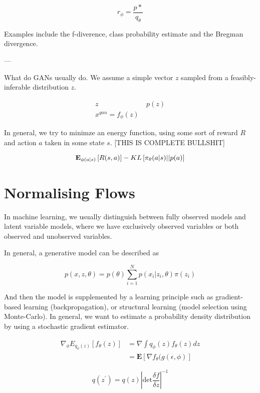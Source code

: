 \documentclass[a4paper,12pt,twoside,openright]{report}
\begin{document}
\begin{equation}
r_{\phi} = \frac{p*}{q_\theta}
\end{equation}

Examples include the f-diverence, class probability estimate and the Bregman divergence.

---

What do GANs usually do.
We assume a simple vector $z$ sampled from a feasibly-inferable distribution $z$.

\begin{align}
z &~ p(z) \\
x^{gan} = f_\phi(z)
\end{align}

In general, we try to minimze an energy function, using some sort of reward $R$ and action $a$ taken in some state $s$. 
[THIS IS COMPLETE BULLSHIT]

\begin{equation}
\mathbf{E}_{\phi(a|s)} \left[R(s, a)\right] - KL \left[\pi_\theta(a|s) || p(a)\right]
\end{equation}

\section{Normalising Flows}

In machine learning, we usually distinguish between fully observed models and latent variable models, where we have exclusively observed variables or both observed and unobserved variables.

In general, a generative model can be described as 

\begin{equation}
p(x, z, \theta) = p(\theta) \sum_{i=1}^N p(x_i | z_i, \theta) \pi(z_i)
\end{equation}

And then the model is supplemented by a learning principle such as gradient-based learning (backpropagation), or structural learning (model selection using Monte-Carlo).
In general, we want to estimate a probability density distribution by using a stochastic gradient estimator.

\begin{align}
\nabla_\phi E_{q_\phi(z)}  \left[ f_\theta(z) \right] &= \nabla \int q_\phi(z) f_\theta(z)dz \\
&= \mathbf{E} \left[ \nabla f_\theta (g( \epsilon, \phi ) \right]
\end{align}

\begin{equation}
q(z^\prime) = q(z) \left| \text{det} \frac{\delta f}{\delta z} \right|^{-1}
\end{equation}
\end{document}
